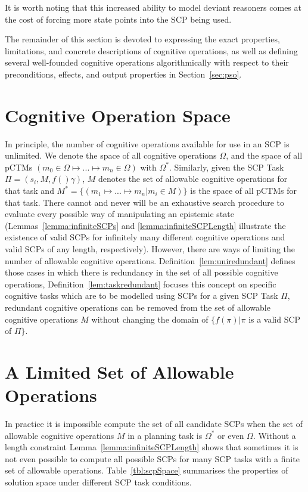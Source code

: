 It is worth noting that this increased ability to model deviant reasoners comes at the cost of forcing more state points into the SCP being used.

The remainder of this section is devoted to expressing the exact properties, limitations, and concrete descriptions of cognitive operations, as well as defining several well-founded cognitive operations algorithmically with respect to their preconditions, effects, and output properties in Section~\ref{sec:pso}.

\section{Cognitive Operation Space}
In principle, the number of cognitive operations available for use in an SCP is unlimited. We denote the space of all cognitive operations $\Omega$, and the space of all pCTMs $(m_0 \in \Omega \longmapsto ... \longmapsto m_n \in \Omega)$ with $\Omega^*$. Similarly, given the SCP Task $\Pi=(s_i,M,f() \gamma)$, $M$ denotes the set of allowable cognitive operations for that task and $M^*=\{(m_1 \longmapsto ... \longmapsto m_n| m_i \in M)\}$ is the space of all pCTMs for that task. There cannot and never will be an exhaustive search procedure to evaluate every possible way of manipulating an epistemic state (Lemmas~\ref{lemma:infiniteSCPs} and \ref{lemma:infiniteSCPLength} illustrate the existence of valid SCPs for infinitely many different cognitive operations and valid SCPs of any length, respectively). However, there are ways of limiting the number of allowable cognitive operations. Definition~\ref{lem:uniredundant} defines those cases in which there is redundancy in the set of all possible cognitive operations, Definition~\ref{lem:taskredundant} focuses this concept on specific cognitive tasks which are to be modelled using SCPs for a given SCP Task $\Pi$, redundant cognitive operations can be removed from the set of allowable cognitive operations $M$ without changing the domain of $\{f(\pi)|\pi$ is a valid SCP of $\Pi\}$.


\section{A Limited Set of Allowable Operations}
In practice it is impossible compute the set of all candidate SCPs when the set of allowable cognitive operations $M$ in a planning task is $\Omega^*$ or even $\Omega$. Without a length constraint Lemma~\ref{lemma:infiniteSCPLength} shows that sometimes it is  not even possible to compute all possible SCPs for many SCP tasks with a finite set of allowable operations. Table~\ref{tbl:scpSpace} summarises the properties of solution space under different SCP task conditions.

